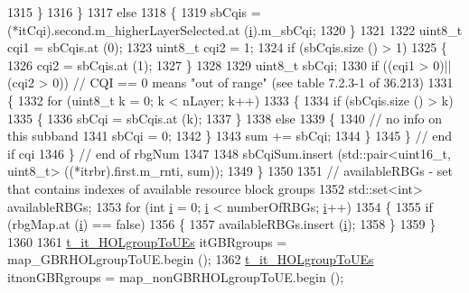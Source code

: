 \begin{DoxyCode}
1315                 \}
1316             \}
1317           \textcolor{keywordflow}{else}
1318             \{
1319               sbCqis = (*itCqi).second.m\_higherLayerSelected.at (\hyperlink{bernuolliDistribution_8m_a6f6ccfcf58b31cb6412107d9d5281426}{i}).m\_sbCqi;
1320             \}
1321 
1322           uint8\_t cqi1 = sbCqis.at (0);
1323           uint8\_t cqi2 = 1;
1324           \textcolor{keywordflow}{if} (sbCqis.size () > 1)
1325             \{
1326               cqi2 = sbCqis.at (1);
1327             \}
1328 
1329           uint8\_t sbCqi;
1330           \textcolor{keywordflow}{if} ((cqi1 > 0)||(cqi2 > 0))               \textcolor{comment}{// CQI == 0 means "out of range" (see table 7.2.3-1 of
       36.213)}
1331             \{
1332               \textcolor{keywordflow}{for} (uint8\_t k = 0; k < nLayer; k++)
1333                 \{
1334                   \textcolor{keywordflow}{if} (sbCqis.size () > k)
1335                     \{
1336                       sbCqi = sbCqis.at (k);
1337                     \}
1338                   \textcolor{keywordflow}{else}
1339                     \{
1340                       \textcolor{comment}{// no info on this subband}
1341                       sbCqi = 0;
1342                     \}
1343                   sum += sbCqi;
1344                 \}
1345             \}               \textcolor{comment}{// end if cqi}
1346         \}        \textcolor{comment}{// end of rbgNum}
1347 
1348       sbCqiSum.insert (std::pair<uint16\_t, uint8\_t> ((*itrbr).first.m\_rnti, sum));
1349     \}
1350 
1351   \textcolor{comment}{// availableRBGs - set that contains indexes of available resource block groups}
1352   std::set<int> availableRBGs;
1353   \textcolor{keywordflow}{for} (\textcolor{keywordtype}{int} \hyperlink{bernuolliDistribution_8m_a6f6ccfcf58b31cb6412107d9d5281426}{i} = 0; \hyperlink{bernuolliDistribution_8m_a6f6ccfcf58b31cb6412107d9d5281426}{i} <  numberOfRBGs; \hyperlink{bernuolliDistribution_8m_a6f6ccfcf58b31cb6412107d9d5281426}{i}++)
1354     \{
1355       \textcolor{keywordflow}{if} (rbgMap.at (\hyperlink{bernuolliDistribution_8m_a6f6ccfcf58b31cb6412107d9d5281426}{i}) == \textcolor{keyword}{false})
1356         \{
1357           availableRBGs.insert (\hyperlink{bernuolliDistribution_8m_a6f6ccfcf58b31cb6412107d9d5281426}{i});
1358         \}
1359     \}
1360 
1361   \hyperlink{namespacens3_afe18eb1d0bcd25c77f1dcb8cf7648b32}{t\_it\_HOLgroupToUEs} itGBRgroups = map\_GBRHOLgroupToUE.begin ();
1362   \hyperlink{namespacens3_afe18eb1d0bcd25c77f1dcb8cf7648b32}{t\_it\_HOLgroupToUEs} itnonGBRgroups = map\_nonGBRHOLgroupToUE.begin ();

\end{DoxyCode}
